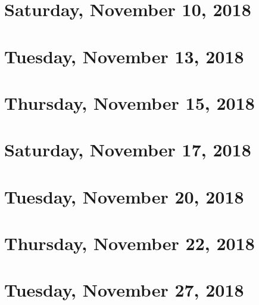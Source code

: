 \documentclass[reqno]{amsart}
\begin{document}
\section{Saturday, November 10, 2018}
    
    
\section{Tuesday, November 13, 2018}
    
    
\section{Thursday, November 15, 2018}
    

\section{Saturday, November 17, 2018}
    
    
\section{Tuesday, November 20, 2018}
    

\section{Thursday, November 22, 2018}
    

\section{Tuesday, November 27, 2018}
    
\end{document}
